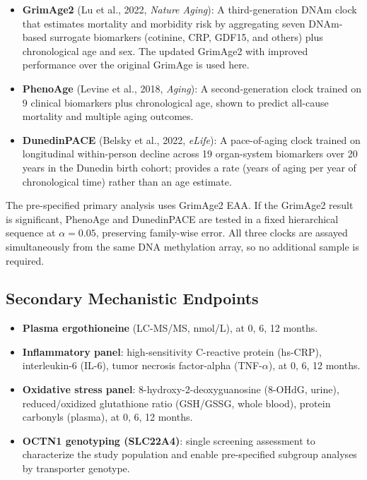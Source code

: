 \documentclass[11pt,a4paper]{article}
\begin{document}
\begin{itemize}[nosep]
  \item \textbf{GrimAge2} (Lu et al., 2022, \textit{Nature Aging}): A third-generation DNAm clock that estimates mortality and morbidity risk by aggregating seven DNAm-based surrogate biomarkers (cotinine, CRP, GDF15, and others) plus chronological age and sex. The updated GrimAge2 with improved performance over the original GrimAge \cite{lu2019} is used here.
  \item \textbf{PhenoAge} (Levine et al., 2018, \textit{Aging}): A second-generation clock trained on 9 clinical biomarkers plus chronological age, shown to predict all-cause mortality and multiple aging outcomes.
  \item \textbf{DunedinPACE} (Belsky et al., 2022, \textit{eLife}): A pace-of-aging clock trained on longitudinal within-person decline across 19 organ-system biomarkers over 20 years in the Dunedin birth cohort; provides a rate (years of aging per year of chronological time) rather than an age estimate.
\end{itemize}

The pre-specified primary analysis uses GrimAge2 EAA. If the GrimAge2 result is significant, PhenoAge and DunedinPACE are tested in a fixed hierarchical sequence at $\alpha = 0.05$, preserving family-wise error. All three clocks are assayed simultaneously from the same DNA methylation array, so no additional sample is required.

\subsection{Secondary Mechanistic Endpoints}

\begin{itemize}[nosep]
  \item \textbf{Plasma ergothioneine} (LC-MS/MS, nmol/L), at 0, 6, 12 months.
  \item \textbf{Inflammatory panel}: high-sensitivity C-reactive protein (hs-CRP), interleukin-6 (IL-6), tumor necrosis factor-alpha (TNF-$\alpha$), at 0, 6, 12 months.
  \item \textbf{Oxidative stress panel}: 8-hydroxy-2-deoxyguanosine (8-OHdG, urine), reduced/oxidized glutathione ratio (GSH/GSSG, whole blood), protein carbonyls (plasma), at 0, 6, 12 months.
  \item \textbf{OCTN1 genotyping (SLC22A4)}: single screening assessment to characterize the study population and enable pre-specified subgroup analyses by transporter genotype.
\end{itemize}
\end{document}
